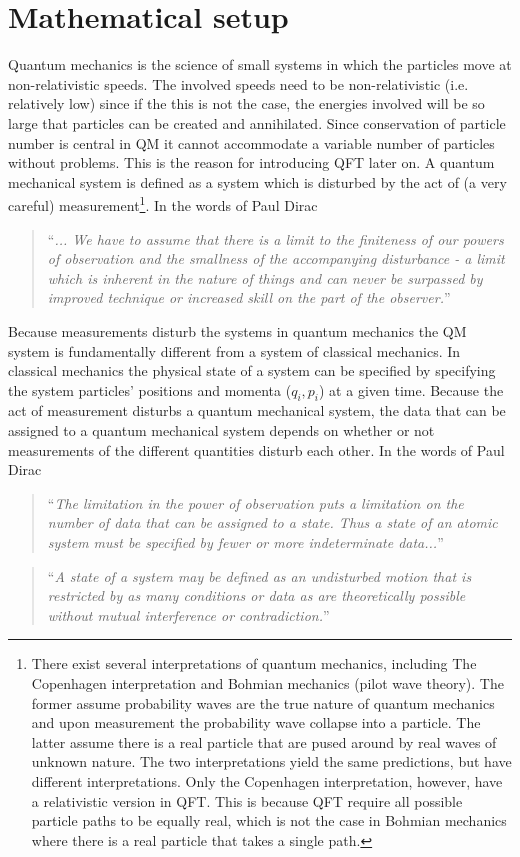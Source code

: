 \chapter{Mathematical setup}
Quantum mechanics is the science of small systems in which the particles move at non-relativistic speeds. The involved speeds need to be non-relativistic (i.e. relatively low) since if the this is not the case, the energies involved will be so large that particles can be created and annihilated. Since conservation of particle number is central in QM it cannot accommodate a variable number of particles without problems. This is the reason for introducing QFT later on. \newline
A quantum mechanical system is defined as a system which is disturbed by the act of (a very careful) measurement\footnote{There exist several interpretations of quantum mechanics, including The Copenhagen interpretation and Bohmian mechanics (pilot wave theory). The former assume probability waves are the true nature of quantum mechanics and upon measurement the probability wave collapse into a particle. The latter assume there is a real particle that are pused around by real waves of unknown nature. The two interpretations yield the same predictions, but have different interpretations. Only the Copenhagen interpretation, however, have a relativistic version in QFT. This is because QFT require all possible particle paths to be equally real, which is not the case in Bohmian mechanics where there is a real particle that takes a single path.}. In the words of Paul Dirac~\citep{dirac}
\begin{quote}
	“\textit{... We have to assume that there is a limit to the finiteness of our powers of observation and the smallness of the accompanying disturbance - a limit which is inherent in the nature of things and can never be surpassed by improved technique or increased skill on the part of the observer.}”
\end{quote}
Because measurements disturb the systems in quantum mechanics the QM system is fundamentally different from a system of classical mechanics. In classical mechanics the physical state of a system can be specified by specifying the system particles' positions and momenta ($q_i,p_i$) at a given time. Because the act of measurement disturbs a quantum mechanical system, the data that can be assigned to a quantum mechanical system depends on whether or not measurements of the different quantities disturb each other. In the words of Paul Dirac~\citep[p.11]{dirac}
\begin{quote}
	“\textit{The limitation in the power of observation puts a limitation on the number of data that can be assigned to a state. Thus a state of an atomic system must be specified by fewer or more indeterminate data...}”
\end{quote} 
\begin{quote}
	“\textit{A state of a system may be defined as an undisturbed motion that is restricted by as many conditions or data as are theoretically possible without mutual interference or contradiction.}”
\end{quote} 

